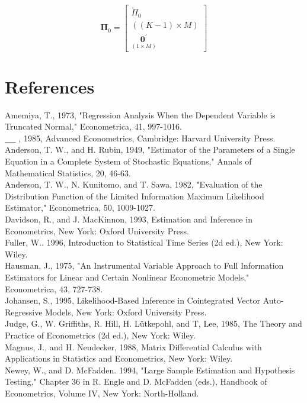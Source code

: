 \documentclass[10pt]{article}
\begin{document}
$$
\boldsymbol{\Pi}_{0}=\left[\begin{array}{c}
\widetilde{\Pi}_{0} \\
((K-1) \times M) \\
\underset{(1 \times M)}{\mathbf{0}^{\prime}}
\end{array}\right]
$$

\section*{References}
Amemiya, T., 1973, "Regression Analysis When the Dependent Variable is Truncated Normal," Econometrica, 41, 997-1016.\\
$\_\_\_\_$ , 1985, Advanced Econometrics, Cambridge: Harvard University Press.\\
Anderson, T. W., and H. Rubin, 1949, "Estimator of the Parameters of a Single Equation in a Complete System of Stochastic Equations," Annals of Mathematical Statistics, 20, 46-63.\\
Anderson, T. W., N. Kunitomo, and T. Sawa, 1982, "Evaluation of the Distribution Function of the Limited Information Maximum Likelihood Estimator," Econometrica, 50, 1009-1027.\\
Davidson, R., and J. MacKinnon, 1993, Estimation and Inference in Econometrics, New York: Oxford University Press.\\
Fuller, W.. 1996, Introduction to Statistical Time Series (2d ed.), New York: Wiley.\\
Hausman, J., 1975, "An Instrumental Variable Approach to Full Information Estimators for Linear and Certain Nonlinear Econometric Models," Econometrica, 43, 727-738.\\
Johansen, S., 1995, Likelihood-Based Inference in Cointegrated Vector Auto-Regressive Models, New York: Oxford University Press.\\
Judge, G., W. Griffiths, R. Hill, H. Lütkepohl, and T, Lee, 1985, The Theory and Practice of Econometrics (2d ed.), New York: Wiley.\\
Magnus, J., and H. Neudecker, 1988, Matrix Differential Calculus with Applications in Statistics and Econometrics, New York: Wiley.\\
Newey, W., and D. McFadden. 1994, "Large Sample Estimation and Hypothesis Testing," Chapter 36 in R. Engle and D. McFadden (eds.), Handbook of Econometrics, Volume IV, New York: North-Holland.
\end{document}
